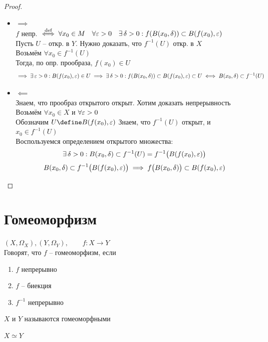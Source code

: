 \begin{proof}
	\hfill
	\begin{itemize}
		\item $ \implies $ \\
		$ f $ непр. $ \bydef[\iff] \forall x_0 \in M \quad \forall \veps > 0 \quad \exist \delta > 0 : f(B(x_0, \delta)) \sub B(f(x_0), \veps) $ \\
		Пусть $ U $ -- откр. в $ Y $. Нужно доказать, что $ f^{-1}(U) $ откр. в $ X $ \\
		Возьмём $ \forall x_0 \in f^{-1}(U) $ \\
		Тогда, по опр. прообраза, $ f(x_0) \in U $
		$$ \implies \exist \veps > 0 : B(f(x_0), \veps) \in U \implies \exist \delta > 0 : f(B(x_0, \delta)) \sub B(f(x_0), \veps) \sub U \iff B(x_0, \delta) \sub f^{-1}(U) $$
		\item $ \impliedby $ \\
		Знаем, что прообраз открытого открыт. Хотим доказать непрерывность \\
		Возьмём $ \forall x_0 \in X $ и $ \forall \veps > 0 $ \\
		Обозначим $ U \define B(f(x_0), \veps) $
		Знаем, что $ f^{-1}(U) $ открыт, и $ x_0 \in f^{-1}(U) $ \\
		Воспользуемся определением открытого множества:
		$$ \exist \delta > 0 : B(x_0, \delta) \sub f^{-1}(U) = f^{-1} \big( B(f(x_0), \veps) \big) $$
		$$ B(x_0, \delta) \sub f^{-1} \big( B(f(x_0), \veps) \big) \implies f \big( B(x_0, \delta) \big) \sub B(f(x_0), \veps) $$
	\end{itemize}
\end{proof}

\section{Гомеоморфизм}

\begin{definition}
	$ (X, \Omega_X), (Y, \Omega_Y), \qquad f : X \to Y $ \\
	Говорят, что $ f $ -- гомеоморфизм, если
	\begin{enumerate}
		\item $ f $ непрерывно
		\item $ f $ -- биекция
		\item $ f^{-1} $ непрерывно
	\end{enumerate}
	$ X $ и $ Y $ называются гомеоморфными
	\begin{notation}
		$ X \simeq Y $
	\end{notation}
\end{definition}

